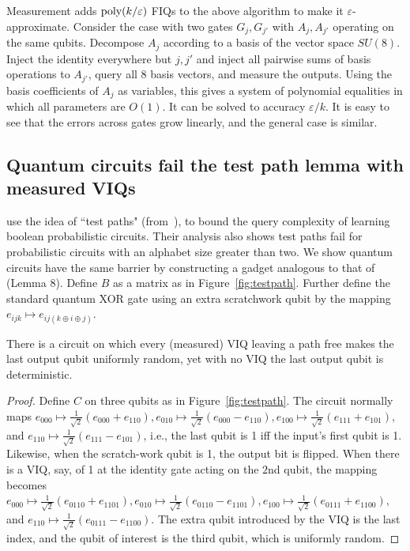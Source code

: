 \documentclass{colt2015}
\begin{document}
Measurement adds $\textup{poly}(k/\varepsilon)$ FIQs to the above algorithm to
make it $\varepsilon$-approximate.  Consider the case with two gates $G_j,
G_{j'}$ with $A_j, A_{j'}$ operating on the same qubits. Decompose $A_j$
according to a basis of the vector space $SU(8)$. Inject the identity
everywhere but $j,j'$ and inject all pairwise sums of basis operations to
$A_{j'}$, query all 8 basis vectors, and measure the outputs. Using the basis
coefficients of $A_j$ as variables, this gives a system of polynomial
equalities in which all parameters are $O(1)$. It can be solved to accuracy
$\varepsilon/k$. It is easy to see that the errors across gates grow linearly,
and the general case is similar.

\subsection{Quantum circuits fail the test path lemma with measured VIQs}
\label{sec:viq}

\cite{jAngluinACER09} use the idea of ``test paths" (from~\cite{AngluinACW2009}), to bound the query
complexity of learning boolean probabilistic circuits. Their analysis also shows
test paths fail for probabilistic circuits with an
alphabet size greater than two. We show quantum circuits have the same
barrier by constructing a gadget analogous to that of~\cite{jAngluinACER09}
(Lemma 8). Define $B$ as a matrix as in Figure~\ref{fig:testpath}. Further
define the standard quantum XOR gate using an extra scratchwork qubit by the
mapping $e_{ijk} \mapsto e_{ij(k \oplus i \oplus j)}$. 

\begin{lemma} \label{lem:testpath}
There is a circuit on which every (measured) VIQ 
leaving a path free makes the last output qubit uniformly random, yet with no VIQ
the last output qubit is deterministic.
\end{lemma}

\begin{proof}
Define $C$ on three qubits as in Figure~\ref{fig:testpath}. The
circuit normally maps $e_{000} \mapsto \frac{1}{\sqrt{2}}(e_{000} + e_{110}),  e_{010}
\mapsto \frac{1}{\sqrt{2}}(e_{000} - e_{110}),  e_{100} \mapsto
\frac{1}{\sqrt{2}}(e_{111} + e_{101}),$ and $e_{110} \mapsto
\frac{1}{\sqrt{2}}(e_{111} - e_{101})$, i.e., the last qubit is 1 iff the
input's first qubit is 1. Likewise, when the scratch-work qubit is 1, the
output bit is flipped. When there is a VIQ, say, of 1 at the identity gate
acting on the $2$nd qubit, the mapping  becomes $e_{000} \mapsto
\frac{1}{\sqrt{2}}(e_{0110} + e_{1101}), e_{010} \mapsto
\frac{1}{\sqrt{2}}(e_{0110} - e_{1101}), e_{100} \mapsto
\frac{1}{\sqrt{2}}(e_{0111} + e_{1100}),$ and $e_{110} \mapsto
\frac{1}{\sqrt{2}}(e_{0111} - e_{1100})$. The extra qubit introduced by the VIQ
is the last index, and the qubit of interest is the third qubit, which is
uniformly random.  \end{proof}
\end{document}
